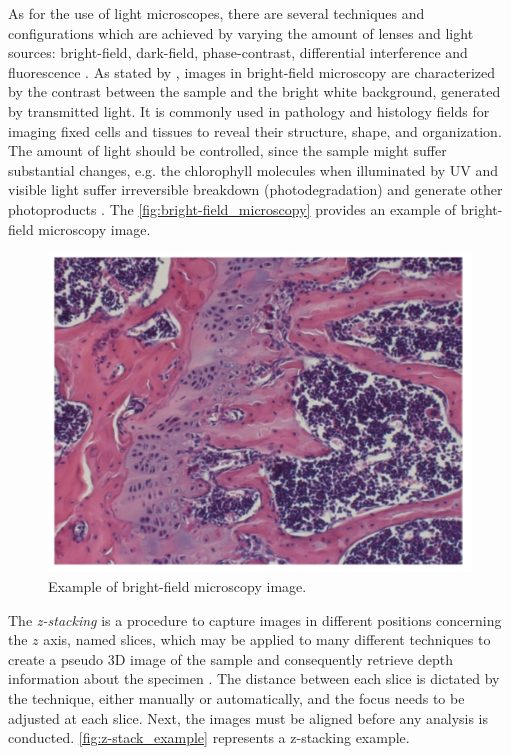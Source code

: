 As for the use of light microscopes, there are several techniques and configurations which are achieved by varying the amount of lenses and light sources: bright-field, dark-field, phase-contrast, differential interference and fluorescence \cite{roane2009microscopic}. As stated by , images in bright-field microscopy are characterized by the contrast between the sample and the bright white background, generated by transmitted light. It is commonly used in pathology and histology fields for imaging fixed cells and tissues to reveal their structure, shape, and organization. The amount of light should be controlled, since the sample might suffer substantial changes, e.g. the chlorophyll molecules when illuminated by UV and visible light suffer irreversible breakdown (photodegradation) and generate other photoproducts \cite{petrovic2017clorophyll}. The \autoref{fig:bright-field_microscopy} provides an example of bright-field microscopy image.

\begin{figure}[htb]
	\centering
	\caption{\label{fig:bright-field_microscopy} Example of bright-field microscopy image.}
	\begin{center}
	    \includegraphics[scale=0.3]{images/bright-field_microscopy.png}
	\end{center}
	\centering
\end{figure}

The \textit{z-stacking} is a procedure to capture images in different positions concerning the $z$ axis, named slices, which may be applied to many different techniques to create a pseudo 3D image of the sample and consequently retrieve depth information about the specimen \cite{lawlor2019introduction}. The distance between each slice is dictated by the technique, either manually or automatically, and the focus needs to be adjusted at each slice. Next, the images must be aligned before any analysis is conducted. \autoref{fig:z-stack_example} represents a z-stacking example.

